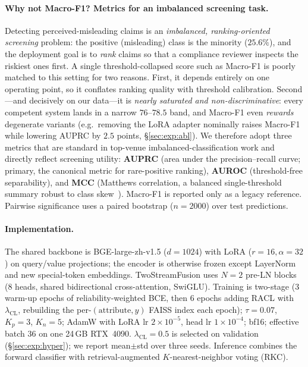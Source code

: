 \paragraph{Why not Macro-F1? Metrics for an imbalanced screening task.}
Detecting perceived-misleading claims is an \emph{imbalanced, ranking-oriented
screening} problem: the positive (misleading) class is the minority
($25.6\%$), and the deployment goal is to \emph{rank} claims so that a
compliance reviewer inspects the riskiest ones first. A single
threshold-collapsed score such as Macro-F1 is poorly matched to this setting for
two reasons. First, it depends entirely on one operating point, so it conflates
ranking quality with threshold calibration. Second---and decisively on our
data---it is \emph{nearly saturated and non-discriminative}: every competent
system lands in a narrow $76$--$78.5$ band, and Macro-F1 even \emph{rewards}
degenerate variants (e.g.\ removing the LoRA adapter nominally raises Macro-F1
while lowering AUPRC by $2.5$ points, \S\ref{sec:exp:abl}). We therefore adopt
three metrics that are standard in top-venue imbalanced-classification work and
directly reflect screening utility: \textbf{AUPRC} (area under the
precision--recall curve; primary, the canonical metric for rare-positive
ranking), \textbf{AUROC} (threshold-free separability), and \textbf{MCC}
(Matthews correlation, a balanced single-threshold summary robust to class
skew~\cite{matthews1975}). Macro-F1 is reported only as a legacy reference.
Pairwise significance uses a paired bootstrap ($n{=}2000$) over test predictions.

\paragraph{Implementation.}
The shared backbone is BGE-large-zh-v1.5 ($d{=}1024$) with LoRA
($r{=}16,\alpha{=}32$) on query/value projections; the encoder is otherwise
frozen except LayerNorm and new special-token embeddings. TwoStreamFusion uses
$N{=}2$ pre-LN blocks (8 heads, shared bidirectional cross-attention, SwiGLU).
Training is two-stage (3 warm-up epochs of reliability-weighted BCE, then 6
epochs adding RACL with $\lambda_{\mathrm{CL}}$, rebuilding the
per-$(\text{attribute},y)$ FAISS index each epoch); $\tau{=}0.07$, $K_p{=}3$,
$K_n{=}5$; AdamW with LoRA lr $2{\times}10^{-5}$, head lr $1{\times}10^{-4}$;
bf16; effective batch 36 on one 24\,GB RTX~4090. $\lambda_{\mathrm{CL}}{=}0.5$ is
selected on validation (\S\ref{sec:exp:hyper}); we report mean$\pm$std over
three seeds. Inference combines the forward classifier with retrieval-augmented
$K$-nearest-neighbor voting (RKC).

